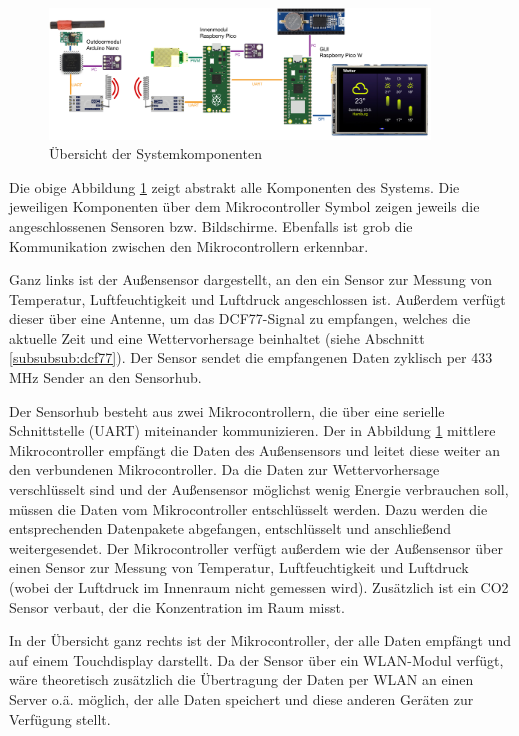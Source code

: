 \documentclass[a4paper,11pt]{article}
\begin{document}
\begin{figure}[H]
  \centering
  \includegraphics[width = 0.9\textwidth]{Systemuebersicht}
  \caption{Übersicht der Systemkomponenten}
  \label{fig:systemuebersicht}
\end{figure}

Die obige Abbildung \ref{fig:systemuebersicht} zeigt abstrakt alle Komponenten des Systems. Die jeweiligen Komponenten über dem Mikrocontroller Symbol
zeigen jeweils die angeschlossenen Sensoren bzw. Bildschirme. Ebenfalls ist grob die Kommunikation zwischen den Mikrocontrollern erkennbar. 

\vspace{0.2cm}
\noindent
Ganz links ist der Außensensor dargestellt, an den ein Sensor zur Messung von Temperatur, Luftfeuchtigkeit und Luftdruck angeschlossen ist. 
Außerdem verfügt dieser über eine Antenne, um das DCF77-Signal zu empfangen, welches die aktuelle Zeit und eine Wettervorhersage beinhaltet (siehe Abschnitt \ref{subsubsub:dcf77}).
Der Sensor sendet die empfangenen Daten zyklisch per 433 MHz Sender an den Sensorhub. 

\vspace{0.2cm}
\noindent
Der Sensorhub besteht aus zwei Mikrocontrollern, die über eine serielle Schnittstelle (UART) miteinander kommunizieren. Der in Abbildung \ref{fig:systemuebersicht} mittlere Mikrocontroller
empfängt die Daten des Außensensors und leitet diese weiter an den verbundenen Mikrocontroller. Da die Daten zur Wettervorhersage verschlüsselt sind und der Außensensor möglichst
wenig Energie verbrauchen soll, müssen die Daten vom Mikrocontroller entschlüsselt werden. Dazu werden die entsprechenden Datenpakete abgefangen, entschlüsselt und anschließend weitergesendet. 
Der Mikrocontroller verfügt außerdem wie der Außensensor über einen Sensor zur Messung von Temperatur, Luftfeuchtigkeit und Luftdruck (wobei der Luftdruck im Innenraum nicht gemessen wird). 
Zusätzlich ist ein CO2 Sensor verbaut, der die Konzentration im Raum misst. 

\vspace{0.2cm}
\noindent
In der Übersicht ganz rechts ist der Mikrocontroller, der alle Daten empfängt und auf einem Touchdisplay darstellt. Da der Sensor über ein WLAN-Modul verfügt, wäre theoretisch
zusätzlich die Übertragung der Daten per WLAN an einen Server o.ä. möglich, der alle Daten speichert und diese anderen Geräten zur Verfügung stellt. 
\end{document}
